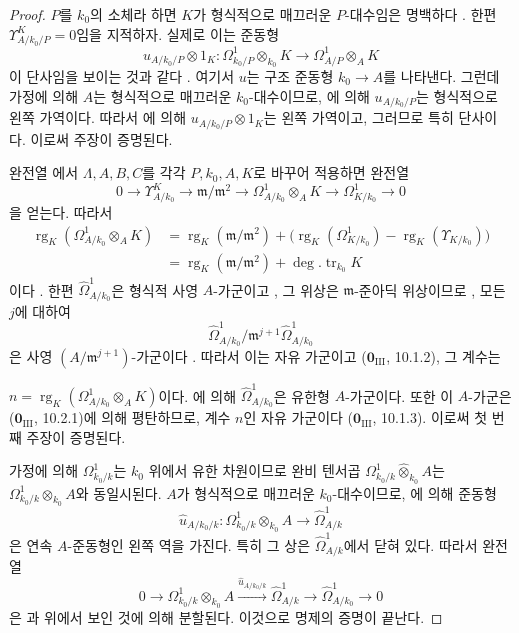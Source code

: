 \begin{proof}
$P$를 $k_0$의 소체라 하면 $K$가 형식적으로 매끄러운
$P$-대수임은 명백하다 . 한편
$\Upsilon^K_{A/k_0/P}=0$임을 지적하자. 실제로 이는 준동형
\[
  u_{A/k_0/P}\otimes1_K:
  \Omega^1_{k_0/P}\otimes_{k_0}K
  \longrightarrow \Omega^1_{A/P}\otimes_A K
\]
이 단사임을 보이는 것과 같다 . 여기서 $u$는
구조 준동형 $k_0\to A$를 나타낸다. 그런데 가정에 의해 $A$는
형식적으로 매끄러운 $k_0$-대수이므로, 에 의해
$u_{A/k_0/P}$는 형식적으로 왼쪽 가역이다. 따라서
에 의해 $u_{A/k_0/P}\otimes1_K$는 왼쪽 가역이고,
그러므로 특히 단사이다. 이로써 주장이 증명된다.

완전열 에서 $\Lambda,A,B,C$를 각각
$P,k_0,A,K$로 바꾸어 적용하면 완전열
\[
  0\longrightarrow \Upsilon^K_{A/k_0}
  \longrightarrow \mathfrak m/\mathfrak m^2
  \longrightarrow \Omega^1_{A/k_0}\otimes_A K
  \longrightarrow \Omega^1_{K/k_0}\longrightarrow0
\]
을 얻는다. 따라서
\[
\begin{split}
  \operatorname{rg}_K(\Omega^1_{A/k_0}\otimes_AK)
  &={\operatorname{rg}}_K(\mathfrak m/\mathfrak m^2)
    +\bigl(\operatorname{rg}_K(\Omega^1_{K/k_0})
    -\operatorname{rg}_K(\Upsilon_{K/k_0})\bigr)\\
  &={\operatorname{rg}}_K(\mathfrak m/\mathfrak m^2)
    +\deg.\operatorname{tr}_{k_0}K
\end{split}
\]
이다 . 한편 $\widehat\Omega^1_{A/k_0}$은 형식적
사영 $A$-가군이고 , 그 위상은
$\mathfrak m$-준아딕 위상이므로 , 모든 $j$에 대하여
\[
\widehat\Omega^1_{A/k_0}/
\mathfrak m^{j+1}\widehat\Omega^1_{A/k_0}
\]
은 사영 $(A/\mathfrak m^{j+1})$-가군이다 . 따라서
이는 자유 가군이고 ($\mathbf 0_{\mathrm{III}}$, 10.1.2), 그 계수는

$n=\operatorname{rg}_K(\Omega^1_{A/k_0}\otimes_AK)$이다.
에 의해 $\widehat\Omega^1_{A/k_0}$은 유한형
$A$-가군이다. 또한 이 $A$-가군은 ($\mathbf 0_{\mathrm{III}}$,
10.2.1)에 의해 평탄하므로, 계수 $n$인 자유 가군이다
($\mathbf 0_{\mathrm{III}}$, 10.1.3). 이로써 첫 번째 주장이 증명된다.

가정에 의해 $\Omega^1_{k_0/k}$는 $k_0$ 위에서 유한 차원이므로 완비
텐서곱 $\Omega^1_{k_0/k}\widehat\otimes_{k_0}A$는
$\Omega^1_{k_0/k}\otimes_{k_0}A$와 동일시된다. $A$가 형식적으로
매끄러운 $k_0$-대수이므로, 에 의해 준동형
\[
  \widehat u_{A/k_0/k}:
  \Omega^1_{k_0/k}\otimes_{k_0}A
  \longrightarrow\widehat\Omega^1_{A/k}
\]
은 연속 $A$-준동형인 왼쪽 역을 가진다. 특히 그 상은
$\widehat\Omega^1_{A/k}$에서 닫혀 있다. 따라서 완전열
\[
  0\longrightarrow \Omega^1_{k_0/k}\otimes_{k_0}A
  \xrightarrow{\widehat u_{A/k_0/k}}\widehat\Omega^1_{A/k}
  \longrightarrow\widehat\Omega^1_{A/k_0}\longrightarrow0
\]
은 과 위에서 보인 것에 의해 분할된다. 이것으로
명제의 증명이 끝난다.
\end{proof}

